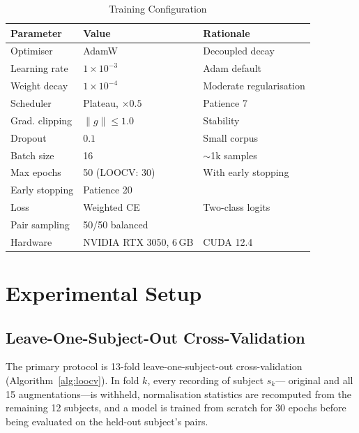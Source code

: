 \documentclass[journal]{IEEEtran}
\newcommand{\tabhead}[1]{\textbf{#1}}
\begin{document}
\begin{table}[!t]
\caption{Training Configuration}
\label{tab:training}
\centering
\footnotesize
\begin{tabular}{@{}lll@{}}
\toprule
\tabhead{Parameter} & \tabhead{Value} & \tabhead{Rationale} \\
\midrule
Optimiser        & AdamW                & Decoupled decay~\cite{adamw} \\
Learning rate    & $1\times10^{-3}$     & Adam default~\cite{adam} \\
Weight decay     & $1\times10^{-4}$     & Moderate regularisation \\
Scheduler        & Plateau, $\times0.5$ & Patience 7 \\
Grad. clipping   & $\lVert g \rVert \le 1.0$ & Stability~\cite{pascanu} \\
Dropout          & $0.1$                & Small corpus~\cite{dropout} \\
Batch size       & 16                   & $\sim$1k samples~\cite{masters_batch} \\
Max epochs       & 50 (LOOCV: 30)       & With early stopping \\
Early stopping   & Patience 20          & \cite{prechelt} \\
Loss             & Weighted CE          & Two-class logits \\
Pair sampling    & 50/50 balanced       & \cite{facenet} \\
Hardware         & NVIDIA RTX 3050, 6\,GB & CUDA 12.4 \\
\bottomrule
\end{tabular}
\end{table}

\section{Experimental Setup}
\label{sec:setup}

\subsection{Leave-One-Subject-Out Cross-Validation}

The primary protocol is 13-fold leave-one-subject-out cross-validation
(Algorithm~\ref{alg:loocv}). In fold $k$, every recording of subject $s_k$---%
original and all 15 augmentations---is withheld, normalisation statistics are
recomputed from the remaining 12 subjects, and a model is trained from scratch
for 30 epochs before being evaluated on the held-out subject's pairs.
\end{document}
